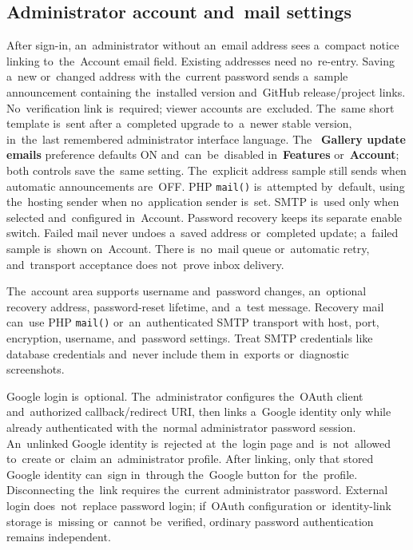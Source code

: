 \documentclass[11pt,a4paper]{article}
\newcommand{\ui}[1]{\textbf{#1}}
\newcommand{\codeword}[1]{\nolinkurl{#1}}
\begin{document}
\subsection{Administrator account and~mail settings}

After sign-in, an~administrator without an~email address sees a~compact notice
linking to~the~Account email field. Existing addresses need no~re-entry.
Saving a~new or~changed address with the~current password sends a~sample
announcement containing the~installed version and~GitHub release/project
links. No~verification link is~required; viewer accounts are~excluded.
The~same short template is~sent after a~completed upgrade to~a~newer stable
version, in~the~last remembered administrator interface language. The~
\ui{Gallery update emails} preference defaults ON and~can~be~disabled
in~\ui{Features} or~\ui{Account}; both controls save the~same setting.
The~explicit address sample still sends when automatic announcements are~OFF.
PHP \codeword{mail()} is~attempted by~default, using the~hosting sender
when no~application sender is~set. SMTP is~used only when selected and~configured
in~Account. Password recovery keeps its separate enable switch. Failed mail
never undoes a~saved address or~completed update; a~failed sample is~shown
on~Account. There is~no~mail queue or~automatic retry, and~transport acceptance
does not~prove inbox delivery.

The~account area supports username and~password changes, an~optional recovery
address, password-reset lifetime, and~a~test message. Recovery mail can~use PHP
\codeword{mail()} or~an~authenticated SMTP transport with host, port,
encryption, username, and~password settings. Treat SMTP credentials like
database credentials and~never include them in~exports or~diagnostic
screenshots.

Google login is~optional. The~administrator configures the~OAuth client
and~authorized callback/redirect URI, then links a~Google identity only while
already authenticated with the~normal administrator password session.
An~unlinked Google identity is~rejected at~the~login page and~is~not~allowed
to~create or~claim an~administrator profile. After linking, only that stored
Google identity can~sign in~through the~Google button for~the~profile.
Disconnecting the~link requires the~current administrator password. External
login does~not~replace password login; if~OAuth configuration or~identity-link
storage is~missing or~cannot be~verified, ordinary password authentication
remains independent.
\end{document}
